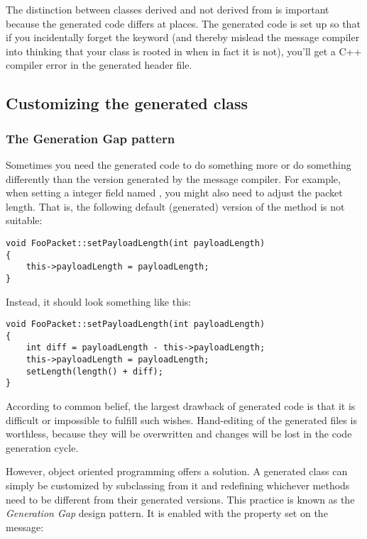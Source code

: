 The distinction between classes derived and not derived from 
is important because the generated code differs at places.
The generated code is set up so that if you incidentally
forget the  keyword (and thereby mislead the
message compiler into thinking that your class is rooted in
 when in fact it is not), you'll get a C++ compiler
error in the generated header file.


\subsection{Customizing the generated class}
\label{sec:ch-messages:customizing-generated-class}


\subsubsection{The Generation Gap pattern}

Sometimes you need the generated code to do something
more or do something differently than the version generated
by the message compiler.
For example, when setting a integer field named ,
you might also need to adjust the packet length. That is,
the following default (generated) version of the
 method is not suitable:

\begin{verbatim}
void FooPacket::setPayloadLength(int payloadLength)
{
    this->payloadLength = payloadLength;
}
\end{verbatim}

Instead, it should look something like this:

\begin{verbatim}
void FooPacket::setPayloadLength(int payloadLength)
{
    int diff = payloadLength - this->payloadLength;
    this->payloadLength = payloadLength;
    setLength(length() + diff);
}
\end{verbatim}

According to common belief, the largest drawback of generated code
is that it is difficult or impossible to fulfill such wishes.
Hand-editing of the generated files is worthless, because
they will be overwritten and changes will be lost
in the code generation cycle.

However, object oriented programming offers a solution.
A generated class can simply be customized by subclassing
from it and redefining whichever methods need to be
different from their generated versions. This practice
is known as the \textit{Generation Gap} design pattern.
It is enabled with the  property set on the
message:

